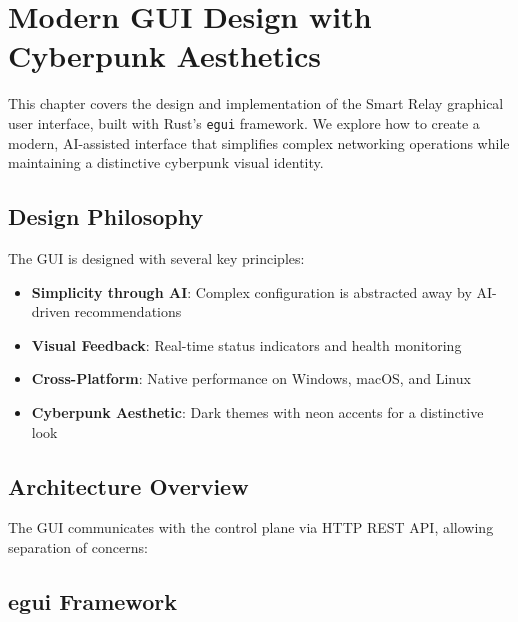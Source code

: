 \chapter{Modern GUI Design with Cyberpunk Aesthetics}

This chapter covers the design and implementation of the Smart Relay graphical user interface, built with Rust's \texttt{egui} framework. We explore how to create a modern, AI-assisted interface that simplifies complex networking operations while maintaining a distinctive cyberpunk visual identity.

\section{Design Philosophy}

The GUI is designed with several key principles:

\begin{itemize}
    \item \textbf{Simplicity through AI}: Complex configuration is abstracted away by AI-driven recommendations
    \item \textbf{Visual Feedback}: Real-time status indicators and health monitoring
    \item \textbf{Cross-Platform}: Native performance on Windows, macOS, and Linux
    \item \textbf{Cyberpunk Aesthetic}: Dark themes with neon accents for a distinctive look
\end{itemize}

\section{Architecture Overview}

The GUI communicates with the control plane via HTTP REST API, allowing separation of concerns:


\section{egui Framework}


